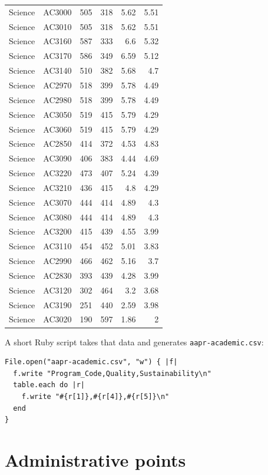 \documentclass[article,10pt,microtype]{article}
\begin{document}
\begin{longtable}{llrrrr}
Science & AC3000 & 505 & 318 & 5.62 & 5.51\\
Science & AC3010 & 505 & 318 & 5.62 & 5.51\\
Science & AC3160 & 587 & 333 & 6.6 & 5.32\\
Science & AC3170 & 586 & 349 & 6.59 & 5.12\\
Science & AC3140 & 510 & 382 & 5.68 & 4.7\\
Science & AC2970 & 518 & 399 & 5.78 & 4.49\\
Science & AC2980 & 518 & 399 & 5.78 & 4.49\\
Science & AC3050 & 519 & 415 & 5.79 & 4.29\\
Science & AC3060 & 519 & 415 & 5.79 & 4.29\\
Science & AC2850 & 414 & 372 & 4.53 & 4.83\\
Science & AC3090 & 406 & 383 & 4.44 & 4.69\\
Science & AC3220 & 473 & 407 & 5.24 & 4.39\\
Science & AC3210 & 436 & 415 & 4.8 & 4.29\\
Science & AC3070 & 444 & 414 & 4.89 & 4.3\\
Science & AC3080 & 444 & 414 & 4.89 & 4.3\\
Science & AC3200 & 415 & 439 & 4.55 & 3.99\\
Science & AC3110 & 454 & 452 & 5.01 & 3.83\\
Science & AC2990 & 466 & 462 & 5.16 & 3.7\\
Science & AC2830 & 393 & 439 & 4.28 & 3.99\\
Science & AC3120 & 302 & 464 & 3.2 & 3.68\\
Science & AC3190 & 251 & 440 & 2.59 & 3.98\\
Science & AC3020 & 190 & 597 & 1.86 & 2\\
\end{longtable}

A short Ruby script takes that data and generates \texttt{aapr-academic.csv}:

\begin{verbatim}
File.open("aapr-academic.csv", "w") { |f|
  f.write "Program_Code,Quality,Sustainability\n"
  table.each do |r|
    f.write "#{r[1]},#{r[4]},#{r[5]}\n"
  end
}
\end{verbatim}


\section*{Administrative points}
\label{sec-2}
\end{document}
